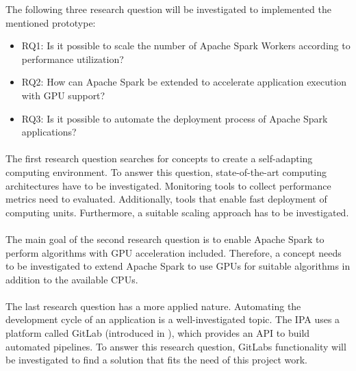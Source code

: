 The following three research question will be investigated to implemented the mentioned prototype:
\begin{itemize}
\item RQ1: Is it possible to scale the number of Apache Spark Workers according to performance utilization?
\item RQ2: How can Apache Spark be extended to accelerate application execution with GPU support?
\item RQ3: Is it possible to automate the deployment process of Apache Spark applications?
\end{itemize}


\paragraph{}
The first research question searches for concepts to create a self-adapting computing environment.
To answer this question, state-of-the-art computing architectures have to be investigated.
Monitoring tools to collect performance metrics need to evaluated. Additionally, tools that enable fast deployment of computing units.
Furthermore, a suitable scaling approach has to be investigated.


\paragraph{}
The main goal of the second research question is to enable Apache Spark to perform algorithms with GPU acceleration included.
Therefore, a concept needs to be investigated to extend Apache Spark to use GPUs for suitable algorithms in addition to the available CPUs.


\paragraph{}
The last research question has a more applied nature.
Automating the development cycle of an application is a well-investigated topic.
The IPA uses a platform called GitLab (introduced in ), which provides an API to build automated pipelines.
To answer this research question, GitLabs functionality will be investigated to find a solution that fits the need of this project work.


